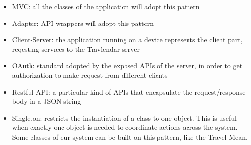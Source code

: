 \begin{itemize}
\item MVC: all the classes of the application will adopt this pattern
\item Adapter: API wrappers will adopt this pattern
\item Client-Server: the application  running on a device represents the client part, reqesting services to the Travlendar server
\item OAuth: standard adopted by the exposed APIs of the server, in order to get authorization to make request from different clients
\item Restful API: a particular kind of APIs that encapsulate the request/response body in a JSON string
\item Singleton: restricts the instantiation of a class to one object. This is useful when exactly one object is needed to coordinate actions across the system. Some classes of our system can be built on this pattern, like the Travel Mean.
\end{itemize}


%
%
%
%
